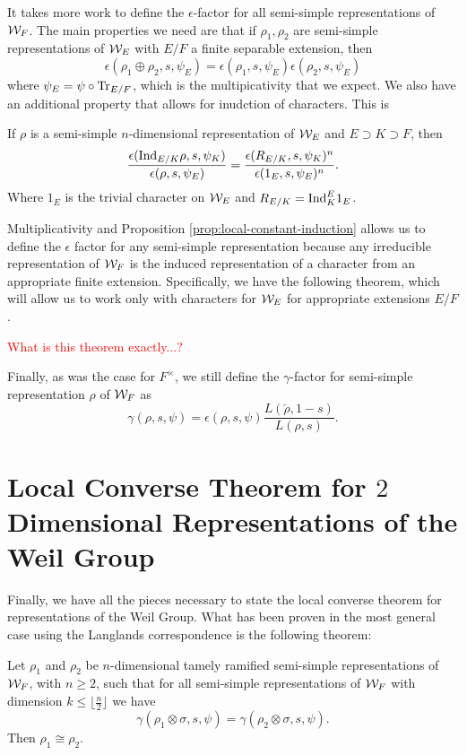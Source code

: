 It takes more work to define the $\epsilon$-factor for all semi-simple representations of $\mathcal{W}_F$.
The main properties we need are that if $\rho_1, \rho_2$ are semi-simple representations of $\mathcal{W}_E$ with $E/F$ a finite separable extension, then
\[\epsilon(\rho_1 \oplus \rho_2,s,\psi_E) = \epsilon(\rho_1,s,\psi_E)\epsilon(\rho_2,s,\psi_E)\]
where $\psi_E = \psi \circ \textrm{Tr}_{E/F}$, which is the multipicativity that we expect.
We also have an additional property that allows for inudction of characters.
This is
\label{prop:local-constant-induction}
\begin{prop}
  If $\rho$ is a semi-simple $n$-dimensional representation of $\mathcal{W}_E$ and $E\supset K \supset F$, then
  \[\frac{\epsilon(\textrm{Ind}_{E/K} \rho, s, \psi_K)}{\epsilon(\rho,s,\psi_E)} = \frac{\epsilon(R_{E/K},s,\psi_K)^n}{\epsilon(1_E,s,\psi_E)^n}.\]
  Where $1_E$ is the trivial character on $\mathcal{W}_E$ and $R_{E/K} = \textrm{Ind}^E_K 1_E$.
\end{prop}
Multiplicativity and Proposition \ref{prop:local-constant-induction} allows us to define the $\epsilon$ factor for any semi-simple representation because any irreducible representation of $\mathcal{W}_F$ is the induced representation of a character from an appropriate finite extension.
Specifically, we have the following theorem, which will allow us to work only with characters for $\mathcal{W}_E$ for appropriate extensions $E/F$.
\begin{theorem}
\textcolor{red}{What is this theorem exactly...?}
\end{theorem}

Finally, as was the case for $F^\times$, we still define the $\gamma$-factor for semi-simple representation $\rho$ of $\mathcal{W}_F$ as
\[\gamma(\rho, s ,\psi) = \epsilon(\rho, s, \psi) \frac{L(\check{\rho},1-s)}{L(\rho,s)}.\]

\section{Local Converse Theorem for $2$ Dimensional Representations of the Weil Group}
Finally, we have all the pieces necessary to state the local converse theorem for representations of the Weil Group.
What has been proven in the most general case using the Langlands correspondence is the following theorem:

\begin{theorem}
  Let $\rho_1$ and $\rho_2$ be $n$-dimensional tamely ramified semi-simple representations of $\mathcal{W}_F$, with $n \geq 2$, such that for all semi-simple representations of $\mathcal{W}_F$ with dimension $k \leq \lfloor \frac{n}{2} \rfloor$ we have
  \[\gamma(\rho_1 \otimes \sigma,s,\psi) = \gamma(\rho_2 \otimes \sigma,s,\psi).\]
  Then $\rho_1 \cong \rho_2$.
\end{theorem}

